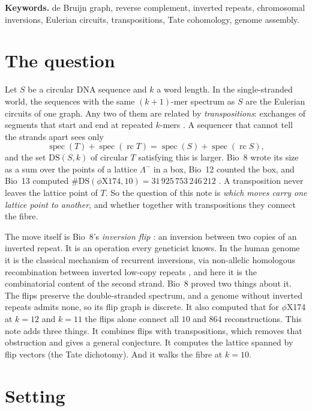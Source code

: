 \documentclass[11pt]{article}
\theoremstyle{plain}
\theoremstyle{definition}
\theoremstyle{remark}
\newcommand{\spec}{\operatorname{spec}}
\newcommand{\DS}{\mathrm{DS}}
\newcommand{\Lm}{\Lambda^{-}}
\newcommand{\rc}{\operatorname{rc}}
\begin{document}
\medskip
\noindent\textbf{Keywords.} de Bruijn graph, reverse complement, inverted repeats, chromosomal
inversions, Eulerian circuits, transpositions, Tate cohomology, genome assembly.

\section{The question}\label{sec:question}

Let $S$ be a circular DNA sequence and $k$ a word length. In the single-stranded world, the sequences
with the same $(k+1)$-mer spectrum as $S$ are the Eulerian circuits of one graph. Any two of them are
related by \emph{transpositions}: exchanges of segments that start and end at repeated $k$-mers
\cite{Ukk92,Pev95}. A sequencer that cannot tell the strands apart sees only
\[
\spec(T)+\spec(\rc T)=\spec(S)+\spec(\rc S),
\]
and the set $\DS(S,k)$ of circular $T$ satisfying this is larger. Bio~8 wrote its size as a sum over the
points of a lattice $\Lm$ in a box, Bio~12 counted the box, and Bio~13 computed
$\#\DS(\phi\mathrm X174,10)=31\,925\,753\,246\,212$ \cite{Bio8,Bio12,Bio13}. A transposition never
leaves the lattice point of $T$. So the question of this note is \emph{which moves carry one lattice point
to another}, and whether together with transpositions they connect the fibre.

The move itself is Bio~8's \emph{inversion flip} \cite[\S7]{Bio8}: an inversion between two copies of an
inverted repeat. It is an operation every geneticist knows. In the human genome it is the classical
mechanism of recurrent inversions, via non-allelic homologous recombination between inverted low-copy
repeats \cite{SL02}, and here it is the combinatorial content of the second strand. Bio~8 proved two
things about it. The flips preserve the double-stranded spectrum, and a genome without inverted repeats
admits none, so its flip graph is discrete. It also computed that for $\phi$X174 at $k=12$ and $k=11$ the
flips alone connect all $10$ and $864$ reconstructions. This note adds three things. It combines flips
with transpositions, which removes that obstruction and gives a general conjecture. It computes the
lattice spanned by flip vectors (the Tate dichotomy). And it walks the fibre at $k=10$.

\section{Setting}\label{sec:setting}
\end{document}
